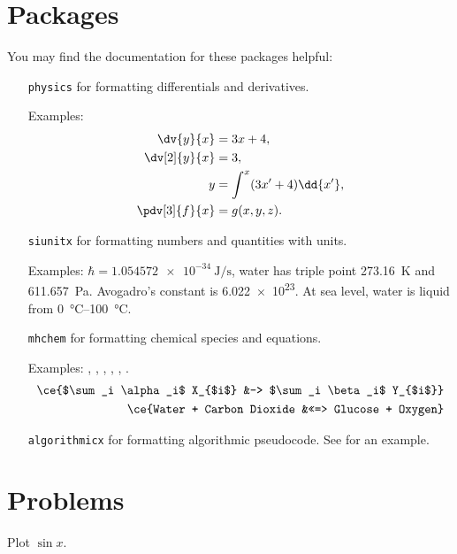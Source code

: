 \section{Packages}

You may find the documentation for these packages helpful:
\begin{itemize}
    \item[\texttt{physics}] for formatting differentials and derivatives.
    
        Examples:
        \begin{align*}
          \dv{y}{x} &= 3x + 4, \\
          \dv[2]{y}{x} &= 3, \\
          y &= \int^x (3x'+4) \dd{x'}, \\
          \pdv[3]{f}{x} &= g(x,y,z).
        \end{align*}

    \item[\texttt{siunitx}] for formatting numbers and quantities with units.
    
        Examples: $\hbar=\SI{1.054572e-34}{\joule\per\second}$, water has triple point \SI{273.16}{\kelvin} and \SI{611.657}{\pascal}.
        Avogadro's constant is \num{6.022e23}.
        At sea level, water is liquid from \SIrange{0}{100}{\celsius}.
    
    \item[\texttt{mhchem}] for formatting chemical species and equations.
    
        Examples: , , , , , .
        \begin{align*}
            \ce{$\sum_i \alpha_i$ X_{$i$} &-> $\sum_i \beta_i$ Y_{$i$}} \\
            \ce{Water + Carbon Dioxide &<<=> Glucose + Oxygen}
        \end{align*}
        
    \item[\texttt{algorithmicx}] for formatting algorithmic pseudocode. See  for an example.
\end{itemize}


\section{Problems}

\begin{problem}[quantitative,label=prob:tut:sine]
  Plot $\sin x$.
\end{problem}

